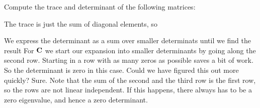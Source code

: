 




Compute the trace and determinant of the following matrices: 

\solution

The trace is just the sum of diagonal elements, so

We express the determinant as a sum over smaller determinats until we find the result 
For ${\bf C}$ we start our expansion into smaller determinants by going along the second row. Starting in a row with as many zeros as possible saves a bit of work. 
So the determinant is zero in this case. Could we have figured this out more quickly? Sure. Note that the sum of the second and the third row is the first row, so the rows are not linear independent. If this happens, there always has to be a zero eigenvalue, and hence a zero determinant. 



